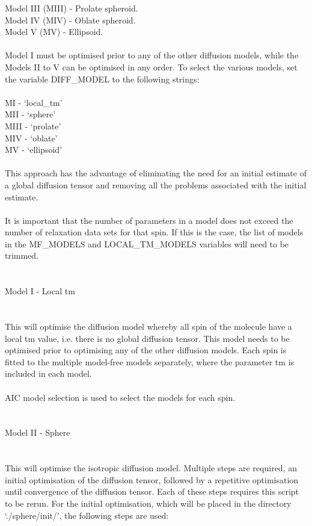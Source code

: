 \begin{htmlonly}
\begin{htmlonly}
\begin{exampleenv}
    Model III (MIII) - Prolate spheroid. \\
    Model IV  (MIV)  - Oblate spheroid. \\
    Model V   (MV)   - Ellipsoid. \\
 \\
Model I must be optimised prior to any of the other diffusion models, while the Models II to V can be optimised in any order.  To select the various models, set the variable DIFF\_MODEL to the following strings: \\
 \\
    MI   - `local\_tm' \\
    MII  - `sphere' \\
    MIII - `prolate' \\
    MIV  - `oblate' \\
    MV   - `ellipsoid' \\
 \\
This approach has the advantage of eliminating the need for an initial estimate of a global diffusion tensor and removing all the problems associated with the initial estimate. \\
 \\
It is important that the number of parameters in a model does not exceed the number of relaxation data sets for that spin.  If this is the case, the list of models in the MF\_MODELS and LOCAL\_TM\_MODELS variables will need to be trimmed. \\
 \\
 \\
Model I - Local tm \\
~~~~~~~~~~~~~~~~~~ \\
 \\
This will optimise the diffusion model whereby all spin of the molecule have a local tm value, i.e. there is no global diffusion tensor.  This model needs to be optimised prior to optimising any of the other diffusion models.  Each spin is fitted to the multiple model-free models separately, where the parameter tm is included in each model. \\
 \\
AIC model selection is used to select the models for each spin. \\
 \\
 \\
Model II - Sphere \\
~~~~~~~~~~~~~~~~~ \\
 \\
This will optimise the isotropic diffusion model.  Multiple steps are required, an initial optimisation of the diffusion tensor, followed by a repetitive optimisation until convergence of the diffusion tensor.  Each of these steps requires this script to be rerun. For the initial optimisation, which will be placed in the directory `./sphere/init/', the following steps are used: \\

\end{exampleenv}
\end{htmlonly}
\end{htmlonly}
